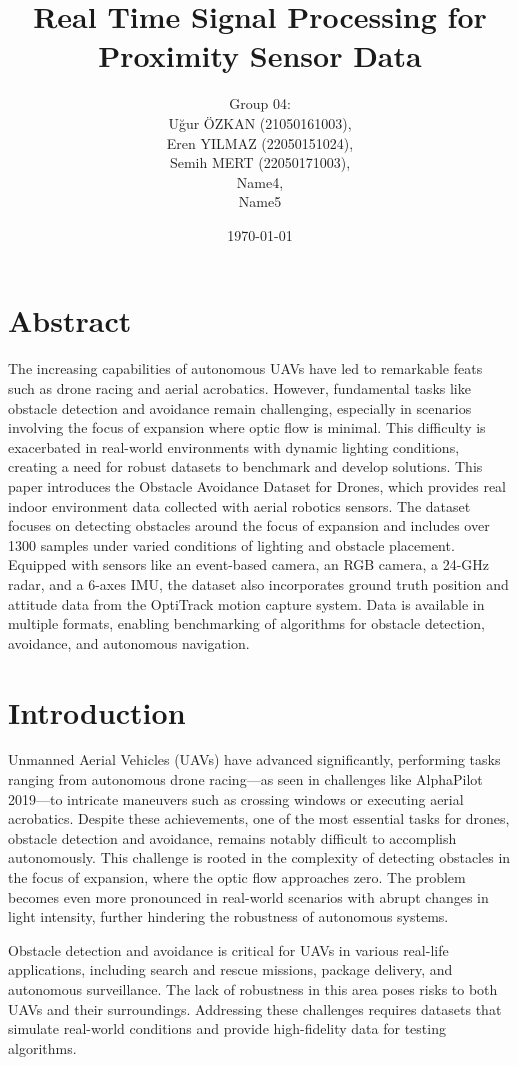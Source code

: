 \documentclass[12pt,a4paper]{article}
\title{Real Time Signal Processing for Proximity Sensor Data}
\author{
    Group 04: \\
    Uğur ÖZKAN (21050161003), \\
    Eren YILMAZ (22050151024), \\
    Semih MERT (22050171003), \\
    Name4, \\
    Name5
}
\date{\today}
\begin{document}
\maketitle
\section{Abstract}

The increasing capabilities of autonomous UAVs have led to remarkable feats such as drone racing and aerial acrobatics. However, fundamental tasks like obstacle detection and avoidance remain challenging, especially in scenarios involving the focus of expansion where optic flow is minimal. This difficulty is exacerbated in real-world environments with dynamic lighting conditions, creating a need for robust datasets to benchmark and develop solutions. This paper introduces the Obstacle Avoidance Dataset for Drones, which provides real indoor environment data collected with aerial robotics sensors. The dataset focuses on detecting obstacles around the focus of expansion and includes over 1300 samples under varied conditions of lighting and obstacle placement. Equipped with sensors like an event-based camera, an RGB camera, a 24-GHz radar, and a 6-axes IMU, the dataset also incorporates ground truth position and attitude data from the OptiTrack motion capture system. Data is available in multiple formats, enabling benchmarking of algorithms for obstacle detection, avoidance, and autonomous navigation.

\section{Introduction}

Unmanned Aerial Vehicles (UAVs) have advanced significantly, performing tasks ranging from autonomous drone racing—as seen in challenges like AlphaPilot 2019—to intricate maneuvers such as crossing windows or executing aerial acrobatics. Despite these achievements, one of the most essential tasks for drones, obstacle detection and avoidance, remains notably difficult to accomplish autonomously. This challenge is rooted in the complexity of detecting obstacles in the focus of expansion, where the optic flow approaches zero. The problem becomes even more pronounced in real-world scenarios with abrupt changes in light intensity, further hindering the robustness of autonomous systems.

Obstacle detection and avoidance is critical for UAVs in various real-life applications, including search and rescue missions, package delivery, and autonomous surveillance. The lack of robustness in this area poses risks to both UAVs and their surroundings. Addressing these challenges requires datasets that simulate real-world conditions and provide high-fidelity data for testing algorithms.
\end{document}
